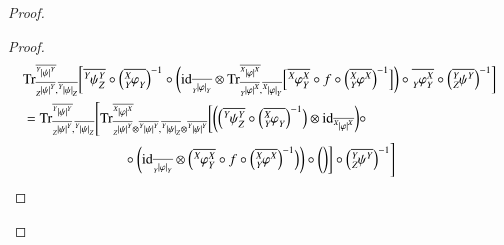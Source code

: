 \documentclass{amsart}
\def\tn{\textnormal}
\def\Trace{\tn{Tr}}
\def\ol{\overline}
\def\id{\tn{id}}
\newcommand{\feeddd}[3]{{\tensor*[^{#2}_{\color{white}{!}}]{{|#1|}}{^{#3}}}}%
\newcommand{\feeddc}[3]{{\tensor*[^{#2}]{{|#1|}}{_{#3}}}}
\newcommand{\feedcd}[3]{{\tensor*[_{#2}]{{|#1|}}{^{#3}}}}
\newcommand{\feedcc}[3]{{\tensor*[^{\color{white}{!}}_{#2}]{{|#1|}}{_{#3}}}}
\newcommand{\feedda}[3]{{\tensor*[^{#2}_{\color{white}{!}}]{{#1}}{^{#2}_{#3}}}}
\newcommand{\feedca}[3]{{\tensor*[_{#2}]{{#1}}{_{#2}^{#3}}}}
\newcommand{\feedad}[3]{{\tensor*[^{#2}_{#3}]{{#1}}{^{#2}}}}
\newcommand{\feedac}[3]{{\tensor*[_{#2}^{#3}]{{#1}}{_{#2}}}}
\theoremstyle{remark}
\theoremstyle{definition}
\begin{document}
\begin{proof}
\begin{proof}
\begin{align*}
&\Trace^{\ol{\feeddd{\psi}{Y}{Y}}}_{\ol{\feedcd{\psi}{Z}{Y}},\ol{\feeddc{\psi}{Y}{Z}}}
\bigg[\ol{\feedda{\psi}{Y}{Z}}\circ\Big(\ol{\feedac{\varphi}{Y}{X}}\Big)^{-1}\circ\bigg(\id_{\ol{\feedcc{\varphi}{Y}{Y}}}\otimes \Trace^{\ol{\feeddd{\varphi}{X}{X}}}_{\ol{\feedcd{\varphi}{Y}{X}},\ol{\feeddc{\varphi}{X}{Y}}}\Big[\ol{\feedda{\varphi}{X}{Y}}\circ f\circ\Big(\ol{\feedad{\varphi}{X}{Y}}\Big)^{-1}\Big]\bigg)\circ\ol{\feedca{\varphi}{Y}{X}}\circ\Big(\ol{\feedad{\psi}{Y}{Z}}\Big)^{-1}\bigg]\\
&=\Trace^{\ol{\feeddd{\psi}{Y}{Y}}}_{\ol{\feedcd{\psi}{Z}{Y}},\ol{\feeddc{\psi}{Y}{Z}}}
\Bigg[\Trace^{\ol{\feeddd{\varphi}{X}{X}}}_{\ol{\feedcd{\psi}{Z}{Y}}\otimes\ol{\feeddd{\psi}{Y}{Y}},\ol{\feeddc{\psi}{Y}{Z}}\otimes\ol{\feeddd{\psi}{Y}{Y}}}\bigg[\bigg(\Big(\ol{\feedda{\psi}{Y}{Z}}\circ\Big(\ol{\feedac{\varphi}{Y}{X}}\Big)^{-1}\Big)\otimes\id_{\ol{\feeddd{\varphi}{X}{X}}}\bigg)\circ\\
&\hspace{1in}\circ\bigg(\id_{\ol{\feedcc{\varphi}{Y}{Y}}}\otimes\Big(\ol{\feedda{\varphi}{X}{Y}}\circ f\circ\Big(\ol{\feedad{\varphi}{X}{Y}}\Big)^{-1}\Big)\bigg)\circ\bigg(\bigg)\bigg]\circ\Big(\ol{\feedad{\psi}{Y}{Z}}\Big)^{-1}\Bigg]\\
\end{align*}



\end{proof}
\end{proof}
\end{document}
